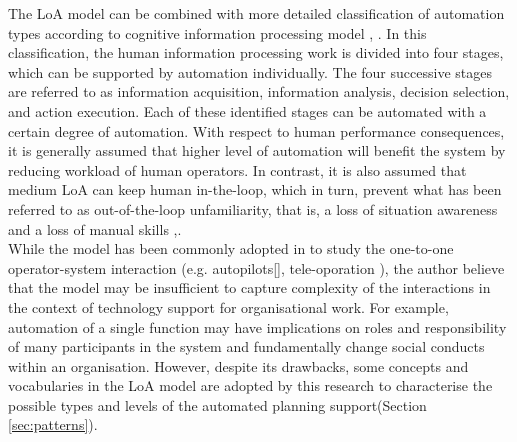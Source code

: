 The \ac{LoA} model can be combined with more detailed classification of automation types according to cognitive information processing model \cite{Parasuraman2000}, \cite{Manzey2012}. In this classification,  the human information processing work is divided into four stages, which can be supported by automation individually. The four successive stages are referred to as information acquisition, information analysis, decision selection, and action execution. Each of these identified stages can be automated with a certain degree of automation. With respect to human performance consequences, it is generally assumed that higher level of automation will benefit the system by reducing workload of human operators. In contrast, it is also assumed that medium \ac{LoA} can keep human in-the-loop, which in turn, prevent what has been referred to as out-of-the-loop unfamiliarity, that is, a loss of situation awareness and a loss of manual skills \cite{Kaber1997},\cite{Parasuraman2010}.\\

While the model has been commonly adopted in to study the one-to-one operator-system interaction (e.g. autopilots[], tele-oporation \cite{Schwarz2014}), the author believe that the model may be insufficient to capture complexity of the interactions in the context of technology support for organisational work. For example, automation of a single function may have implications on roles and responsibility of many participants in the system and fundamentally change social conducts within an organisation. However, despite its drawbacks, some concepts and vocabularies in the \ac{LoA} model are adopted by this research to characterise the possible types and levels of the automated planning support(Section \ref{sec:patterns}).\\

